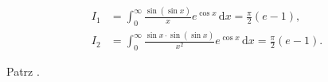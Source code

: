 %

\begin{problem_with_solution}
    \label{valean_1_41}%
    \begin{align}
        I_1 & = \int_0^\infty \frac{\sin (\sin x)}{x} e^{\cos x} \,\mathrm{d} x = \frac{\pi} 2 (e - 1), \\
        I_2 & = \int_0^\infty \frac{\sin x \cdot \sin (\sin x)}{x^2} e^{\cos x} \,\mathrm{d} x = \frac{\pi} 2 (e - 1).
    \end{align} 
\end{problem_with_solution}

\begin{solution}
    Patrz \cite[s. ?????]{valean19}.
\end{solution}

%